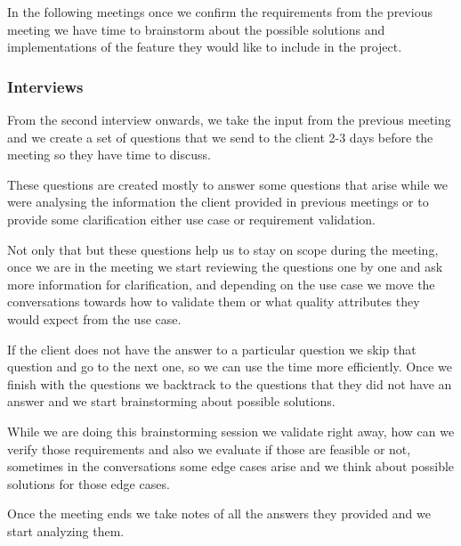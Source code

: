\noindent In the following meetings once we confirm the requirements from the 
previous meeting we have time to brainstorm about the possible solutions and 
implementations of the feature they would like to include in the project.

\subsubsection{Interviews}
\begin{flushleft}
From the second interview onwards, we take the input from the previous meeting 
and we create a set of questions that we send to the client 2-3 days before 
the meeting so they have time to discuss. \newline

\noindent These questions are created mostly to answer some questions that 
arise while we were analysing the information the client provided in previous 
meetings or to provide some clarification either use case or 
requirement validation.  \newline

\noindent Not only that but these questions help us to stay on scope during 
the meeting, once we are in the meeting we start reviewing the questions one 
by one and ask more information for clarification, and depending on the use 
case we move the conversations towards how to validate them or what quality 
attributes they would expect from the use case. \newline

\noindent If the client does not have the answer to a particular question we 
skip that question and go to the next one, so we can use the time more 
efficiently. Once we finish with the questions we backtrack to the questions 
that they did not have an answer and we start brainstorming about 
possible solutions.  \newline

\noindent While we are doing this brainstorming session we validate right 
away, how can we verify those requirements and also we evaluate if those are 
feasible or not, sometimes in the conversations some edge cases arise and we 
think about possible solutions for those edge cases. \newline

\noindent Once the meeting ends we take notes of all the answers they provided 
and we start analyzing them.
\end{flushleft}